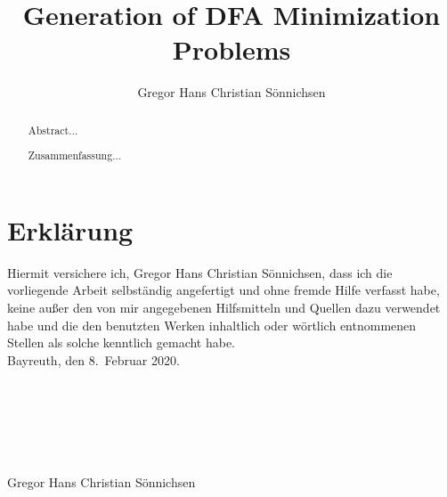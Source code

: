 \documentclass[a4paper, oneside, 12pt]{report}
\title{Generation of DFA Minimization Problems}
\author{Gregor Hans Christian Sönnichsen}
\theoremstyle{definition}
\theoremstyle{remark}
\begin{document}
	
	\maketitle
	
	\begin{abstract}
		Abstract$\ldots$
	\end{abstract}

	\renewcommand{\abstractname}{Generierung von DFA Minimierungsproblemen\\-\\Zusammenfassung}
	\begin{abstract}
		Zusammenfassung$\ldots$
	\end{abstract}
	
	
	\renewcommand{\contentsname}{Table of Contents}
	\tableofcontents
	
	
	
	
	
	
	
	\appendix
	
	\nocite{*}
	
	
	
	\chapter*{Erklärung}
	
	Hiermit versichere ich, Gregor Hans Christian Sönnichsen, dass ich die vorliegende Arbeit selbständig angefertigt und	ohne fremde Hilfe verfasst habe, keine außer den von mir angegebenen Hilfsmitteln und Quellen dazu verwendet habe und die den benutzten Werken inhaltlich oder wörtlich entnommenen Stellen als solche kenntlich gemacht habe. \\
	
	\noindent Bayreuth, den 8.\ Februar 2020. \\\\\\\\\\\\\\
	\noindent Gregor Hans Christian Sönnichsen
\end{document}
